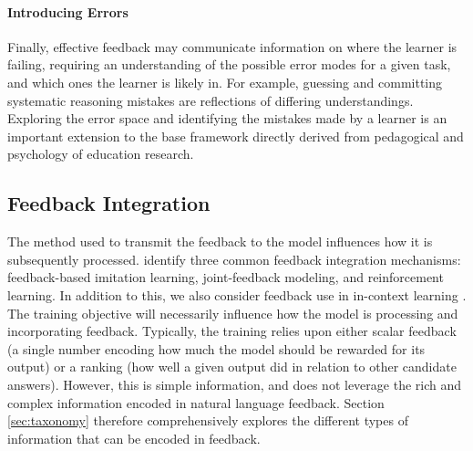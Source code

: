 \paragraph{Introducing Errors} Finally, effective feedback may communicate information on where the learner is failing, requiring an understanding of the possible error modes for a given task, and which ones the learner is likely in. For example, guessing and committing systematic reasoning mistakes are reflections of differing understandings. Exploring the error space and identifying the mistakes made by a learner is an important extension to the base framework directly derived from pedagogical and psychology of education research.

\subsection{Feedback Integration}

The method used to transmit the feedback to the model influences how it is subsequently processed. \citet{fernandes_bridging_2023} identify three common feedback integration mechanisms: feedback-based imitation learning, joint-feedback modeling, and reinforcement learning. In addition to this, we also consider feedback use in in-context learning \citep{brown2020language}. The training objective will necessarily influence how the model is processing and incorporating feedback.
Typically, the training relies upon either scalar feedback (a single number encoding how much the model should be rewarded for its output) or a ranking (how well a given output did in relation to other candidate answers). However, this is simple information, and does not leverage the rich and complex information encoded in natural language feedback. 
Section \ref{sec:taxonomy} therefore comprehensively explores the different types of information that can be encoded in feedback.

